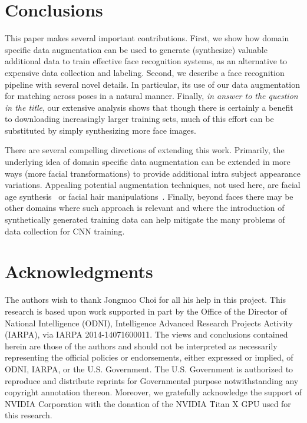 \documentclass[runningheads]{llncs}
\begin{document}
\section{Conclusions}\label{sec:conclusions}
This paper makes several important contributions. First, we show how domain specific data augmentation can be used to generate (synthesize) valuable additional data to train effective face recognition systems, as an alternative to expensive data collection and labeling. Second, we describe a face recognition pipeline with several novel details. In particular, its use of our data augmentation for matching across poses in a natural manner. Finally, {\em in answer to the question in the title}, our extensive analysis shows that though there is certainly a benefit to downloading increasingly larger training sets, much of this effort can be substituted by simply synthesizing more face images. 


There are several compelling directions of extending this work. Primarily, the underlying idea of domain specific data augmentation can be extended in more ways (more facial transformations) to provide additional intra subject appearance variations. Appealing potential augmentation techniques, not used here, are facial age synthesis~\cite{kemelmacher2014illumination} or facial hair manipulations~\cite{nguyen2008image}. Finally, beyond faces there may be other domains where such approach is relevant and where the introduction of synthetically generated training data can help mitigate the many problems of data collection for CNN training.


\section*{Acknowledgments}
The authors wish to thank Jongmoo Choi for all his help in this project. This research is based upon work supported in part by the Office of the Director of National Intelligence (ODNI), Intelligence Advanced Research Projects Activity (IARPA), via IARPA 2014-14071600011. The views and conclusions contained herein are those of the authors and should not be interpreted as necessarily representing the official policies or endorsements, either expressed or implied, of ODNI, IARPA, or the U.S. Government.  The U.S. Government is authorized to reproduce and distribute reprints for Governmental purpose notwithstanding any copyright annotation thereon. Moreover, we gratefully acknowledge the support of NVIDIA Corporation with the donation of the NVIDIA Titan X GPU used for this research.
\end{document}
